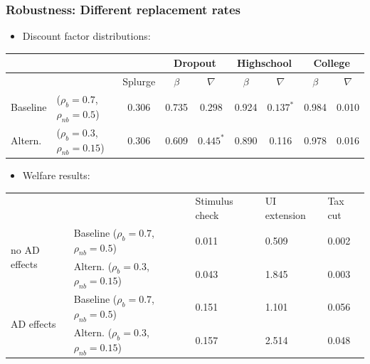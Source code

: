 \documentclass[pdflatex,aspectratio=169]{beamer}
\begin{document}
\begin{frame}
	\frametitle{Robustness: Different replacement rates}
	\centering  
	\small 
	
	\begin{itemize}
		\item Discount factor distributions: 
	\end{itemize}

	\begin{table}
		\begin{tabular}{llc|cccccc} 
			\toprule
			& & & \multicolumn{2}{c}{Dropout} & \multicolumn{2}{c}{Highschool} & \multicolumn{2}{c}{College} \\ \midrule 
			& & Splurge & $\beta$ & $\nabla$ & $\beta$ & $\nabla$ & $\beta$ & $\nabla$ \\ \midrule 
			Baseline & ($\rho_{b}=0.7$, $\rho_{nb}=0.5$) & 0.306 & 0.735 & 0.298 & 0.924 & $0.137^{*}$ & 0.984 & 0.010 \\ 
			Altern. & ($\rho_{b}=0.3$,  $\rho_{nb}=0.15$) & 0.306 & 0.609 & $0.445^{*}$ & 0.890 & 0.116 & 0.978 & 0.016
			\\ \bottomrule 
		\end{tabular}
	
	
	\begin{itemize}
		\item Welfare results: 
	\end{itemize}
		
		\begin{tabular}{@{}lllll@{}}
			\toprule
			&                    & Stimulus check & UI extension & Tax cut \\ \cmidrule(l){1-5} 
			\multirow{2}{*}{no AD effects} 	& Baseline  ($\rho_{b}=0.7$, $\rho_{nb}=0.5$) 		& 0.011          & 0.509        & 0.002   \\
			& Altern.  ($\rho_{b}=0.3$, $\rho_{nb}=0.15$) 	& 0.043          & 1.845        & 0.003   \\ \cmidrule(l){1-5} 
			\multirow{2}{*}{AD effects}		& Baseline  ($\rho_{b}=0.7$, $\rho_{nb}=0.5$)    	& 0.151          & 1.101        & 0.056   \\
			& Altern.  ($\rho_{b}=0.3$, $\rho_{nb}=0.15$)    & 0.157          & 2.514        & 0.048   \\ \cmidrule(l){1-5} 
		\end{tabular}
	\end{table}
\end{frame}
\end{document}
